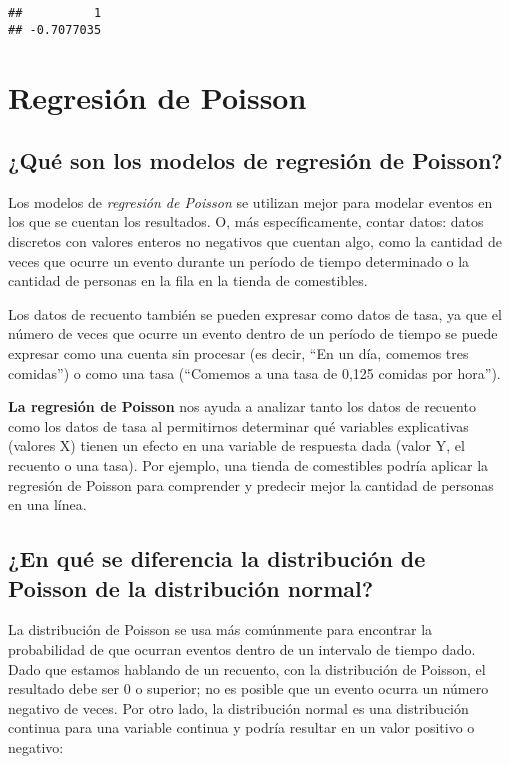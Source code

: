 \documentclass[
]{book}
\begin{document}
\begin{verbatim}
##          1 
## -0.7077035
\end{verbatim}

\hypertarget{regresiuxf3n-de-poisson}{%
\chapter{Regresión de Poisson}\label{regresiuxf3n-de-poisson}}

\hypertarget{quuxe9-son-los-modelos-de-regresiuxf3n-de-poisson}{%
\section{¿Qué son los modelos de regresión de Poisson?}\label{quuxe9-son-los-modelos-de-regresiuxf3n-de-poisson}}

Los modelos de \emph{regresión de Poisson} se utilizan mejor para modelar eventos en los que se cuentan los resultados. O, más específicamente, contar datos: datos discretos con valores enteros no negativos que cuentan algo, como la cantidad de veces que ocurre un evento durante un período de tiempo determinado o la cantidad de personas en la fila en la tienda de comestibles.

Los datos de recuento también se pueden expresar como datos de tasa, ya que el número de veces que ocurre un evento dentro de un período de tiempo se puede expresar como una cuenta sin procesar (es decir, ``En un día, comemos tres comidas'') o como una tasa (``Comemos a una tasa de 0,125 comidas por hora'').

\textbf{La regresión de Poisson} nos ayuda a analizar tanto los datos de recuento como los datos de tasa al permitirnos determinar qué variables explicativas (valores X) tienen un efecto en una variable de respuesta dada (valor Y, el recuento o una tasa). Por ejemplo, una tienda de comestibles podría aplicar la regresión de Poisson para comprender y predecir mejor la cantidad de personas en una línea.

\hypertarget{en-quuxe9-se-diferencia-la-distribuciuxf3n-de-poisson-de-la-distribuciuxf3n-normal}{%
\section{¿En qué se diferencia la distribución de Poisson de la distribución normal?}\label{en-quuxe9-se-diferencia-la-distribuciuxf3n-de-poisson-de-la-distribuciuxf3n-normal}}

La distribución de Poisson se usa más comúnmente para encontrar la probabilidad de que ocurran eventos dentro de un intervalo de tiempo dado. Dado que estamos hablando de un recuento, con la distribución de Poisson, el resultado debe ser 0 o superior; no es posible que un evento ocurra un número negativo de veces. Por otro lado, la distribución normal es una distribución continua para una variable continua y podría resultar en un valor positivo o negativo:
\end{document}
